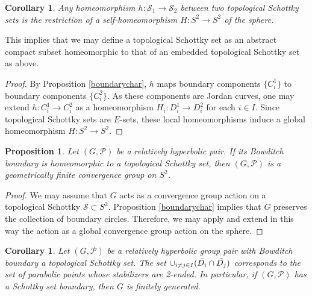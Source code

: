 \documentclass[11pt]{article}
\newtheorem{corollary}[theorem]{Corollary}
\newtheorem{proposition}[theorem]{Proposition}
\theoremstyle{definition}
\newcommand\PP{\mathcal{P}}
\begin{document}
\begin{corollary}\label{c:extension}
Any homeomorphism $h:\mathcal{S}_1\to \mathcal{S}_2$  between two topological  Schottky sets is the restriction of a
self-homeomorphism $H:S^2\to S^2$ of the sphere. \end{corollary}

This implies that we may define a topological Schottky set as an abstract compact subset homeomorphic to that of an embedded topological
Schottky set as above.

\begin{proof} By Proposition \ref{boundarychar}, $h$ maps boundary components $\{C_i^1\}$  to boundary components $\{C_i^2\}$. 
As these components are  Jordan curves, one may extend $h:C_i^1\to C_i^2$ as a homeomorphism $H_i:D_i^1\to D_i^2$ for 
each $i\in I$. Since topological Schottky sets are $E$-sets, these local homeomorphisms 
induce a global homeomorphism $H:S^2\to S^2$.
\end{proof}


\begin{proposition}\label{prop:schotplanar} Let $(G,\PP)$ be a relatively hyperbolic pair. If its Bowditch boundary is homeomorphic
to a topological Schottky set, then $(G,\PP)$ is a geometrically finite convergence group on $S^2$.
\end{proposition}


\begin{proof} We may assume that $G$ acts as a convergence group action on a topological Schottky $\mathcal{S}\subset S^2$. 
Proposition \ref{boundarychar} implies that $G$ preserves the collection of boundary circles. Therefore, we may apply
 \cite[Thm. 5.8]{ph:unifplanar} and extend in this way the action as a global convergence  group action on the sphere.
\end{proof}


\begin{corollary}\label{cor:parabschottky} Let $(G,\PP)$ be a relatively hyperbolic group pair with Bowditch boundary a topological Schottky set. 
The set $\cup_{i\neq j\in I}(\Bar{D_i}\cap \Bar{D_j})$ corresponds to the set of parabolic points whose stabilizers are 2-ended. In particular, if $(G, \PP)$ has a Schottky set boundary, then $G$ is finitely generated. 
\end{corollary}
\end{document}
